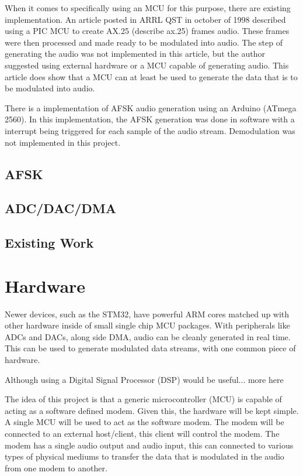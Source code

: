 \documentclass[notitlepage]{report}
\begin{document}
When it comes to specifically using an MCU for this purpose, there are existing implementation. An article posted in ARRL QST in october of 1998 described using a PIC MCU to create AX.25 (describe ax.25) frames audio\cite{hansen_ax25}. These frames were then processed and made ready to be modulated into audio. The step of generating the audio was not implemented in this article, but the author suggested using external hardware or a MCU capable of generating audio. This article does show that a MCU can at least be used to generate the data that is to be modulated into audio.

There is a implementation of AFSK audio generation using an Arduino (ATmega 2560)\cite{arduino_afsk}. In this implementation, the AFSK generation was done in software with a interrupt being triggered for each sample of the audio stream. Demodulation was not implemented in this project.

\subsection{AFSK}

\subsection{ADC/DAC/DMA}

\subsection{Existing Work} %


\section{Hardware}
Newer devices, such as the STM32, have powerful ARM cores matched up with other hardware inside of small single chip MCU packages. With peripherals like ADCs and DACs, along side DMA, audio can be cleanly generated in real time. This can be used to generate modulated data streams, with one common piece of hardware.

Although using a Digital Signal Processor (DSP) would be useful... more here

The idea of this project is that a generic microcontroller (MCU) is capable of acting as a software defined modem. Given this, the hardware will be kept simple. A single MCU will be used to act as the software modem. The modem will be connected to an external host/client, this client will control the modem. The modem has a single audio output and audio input, this can connected to various types of physical mediums to transfer the data that is modulated in the audio from one modem to another.
\end{document}
